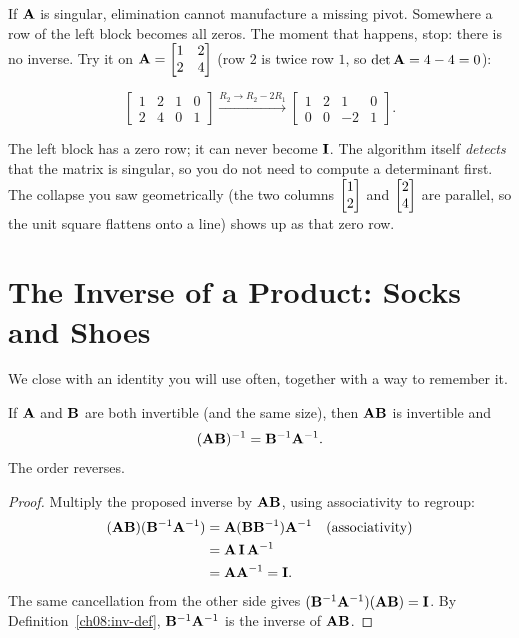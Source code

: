 If $\mathbf{A}$ is singular, elimination cannot manufacture a missing pivot. Somewhere a
row of the left block becomes all zeros. The moment that happens, stop: there is no
inverse. Try it on $\mathbf{A} = \begin{bmatrix} 1 & 2 \\ 2 & 4 \end{bmatrix}$ (row
$2$ is twice row $1$, so $\det\mathbf{A} = 4 - 4 = 0$):

\[
\left[\begin{array}{cc|cc}
1 & 2 & 1 & 0 \\ 2 & 4 & 0 & 1
\end{array}\right]
\xrightarrow{R_2 \to R_2 - 2R_1}
\left[\begin{array}{cc|cc}
1 & 2 & 1 & 0 \\ 0 & 0 & -2 & 1
\end{array}\right].
\]

The left block has a zero row; it can never become $\mathbf{I}$. The algorithm itself
\emph{detects} that the matrix is singular, so you do not need to compute a determinant
first. The collapse you saw geometrically (the two columns $\begin{bmatrix}1\\2\end{bmatrix}$ and $\begin{bmatrix}2\\4\end{bmatrix}$ are
parallel, so the unit square flattens onto a line) shows up as that zero row.

\section{The Inverse of a Product: Socks and Shoes}
\label{ch08:product-inverse}

We close with an identity you will use often, together with a way to remember it.

\begin{theorem}
\label{ch08:abinv}
If $\mathbf{A}$ and $\mathbf{B}$ are both invertible (and the same size), then $\mathbf{A}\mathbf{B}$
is invertible and
\[
(\mathbf{A}\mathbf{B})^{-1} = \mathbf{B}^{-1} \mathbf{A}^{-1}.
\]
The order reverses.
\end{theorem}

\begin{proof}
Multiply the proposed inverse by $\mathbf{A}\mathbf{B}$, using associativity to regroup:
\begin{align*}
(\mathbf{A}\mathbf{B})(\mathbf{B}^{-1}\mathbf{A}^{-1})
&= \mathbf{A}(\mathbf{B}\mathbf{B}^{-1})\mathbf{A}^{-1} && \text{(associativity)}\\
&= \mathbf{A}\,\mathbf{I}\,\mathbf{A}^{-1}\\
&= \mathbf{A}\mathbf{A}^{-1} = \mathbf{I}.
\end{align*}
The same cancellation from the other side gives
$(\mathbf{B}^{-1}\mathbf{A}^{-1})(\mathbf{A}\mathbf{B}) = \mathbf{I}$. By
Definition~\ref{ch08:inv-def}, $\mathbf{B}^{-1}\mathbf{A}^{-1}$ is the inverse of $\mathbf{A}\mathbf{B}$.
\end{proof}


